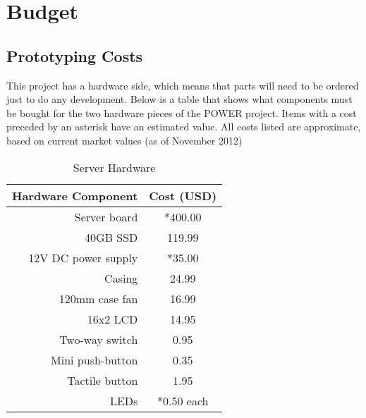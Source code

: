 
\chapter{Budget}

\section{Prototyping Costs}
This project has a hardware side, which means that parts will need to be ordered just to do any development. Below is a table that shows what components must be bought for the two hardware pieces of the POWER project. Items with a cost preceded by an asterisk have an estimated value. All costs listed are approximate, based on current market values (as of November 2012) 

\begin{table}[htbp]
  \centering
  \caption{Server Hardware}
    \begin{tabular}{rc}
    \toprule
    \multicolumn{1}{c}{\textbf{Hardware Component}} & \textbf{Cost (USD)} \\
    \midrule
    Server board & *400.00 \\
    40GB SSD & 119.99 \\
    12V DC power supply & *35.00 \\
    Casing & 24.99 \\
    120mm case fan & 16.99 \\
    16x2 LCD & 14.95 \\
    Two-way switch & 0.95 \\
    Mini push-button & 0.35 \\
    Tactile button & 1.95 \\
    LEDs  & *0.50 each \\
    \bottomrule
    \end{tabular}%
  \label{tab:addlabel}%
\end{table}%

